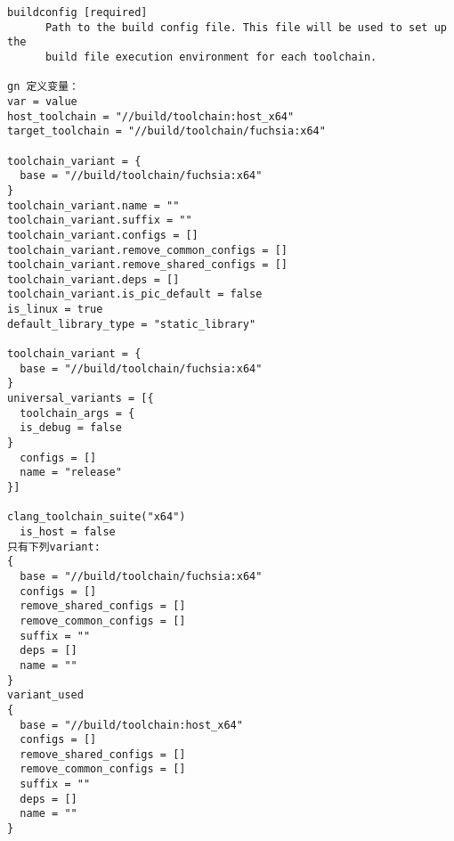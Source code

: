 \begin{verbatim}
buildconfig [required]
      Path to the build config file. This file will be used to set up the
      build file execution environment for each toolchain.

gn 定义变量：
var = value
host_toolchain = "//build/toolchain:host_x64"
target_toolchain = "//build/toolchain/fuchsia:x64"

toolchain_variant = {
  base = "//build/toolchain/fuchsia:x64"
}
toolchain_variant.name = ""
toolchain_variant.suffix = ""
toolchain_variant.configs = []
toolchain_variant.remove_common_configs = []
toolchain_variant.remove_shared_configs = []
toolchain_variant.deps = []
toolchain_variant.is_pic_default = false
is_linux = true
default_library_type = "static_library"

toolchain_variant = {
  base = "//build/toolchain/fuchsia:x64"
}
universal_variants = [{
  toolchain_args = {
  is_debug = false
}
  configs = []
  name = "release"
}]

clang_toolchain_suite("x64")
  is_host = false
只有下列variant:
{
  base = "//build/toolchain/fuchsia:x64"
  configs = []
  remove_shared_configs = []
  remove_common_configs = []
  suffix = ""
  deps = []
  name = ""
}
variant_used
{
  base = "//build/toolchain:host_x64"
  configs = []
  remove_shared_configs = []
  remove_common_configs = []
  suffix = ""
  deps = []
  name = ""
}

\end{verbatim}